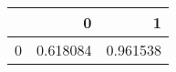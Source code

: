 \begin{tabular}{lrr}
\toprule
{} &         0 &         1 \\
\midrule
0 &  0.618084 &  0.961538 \\
\bottomrule
\end{tabular}
